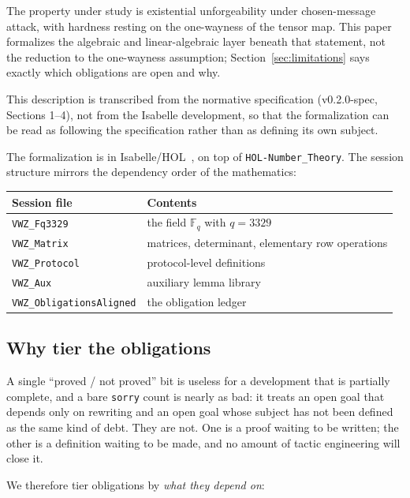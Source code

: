 The property under study is existential unforgeability under chosen-message
attack, with hardness resting on the one-wayness of the tensor map. This paper
formalizes the algebraic and linear-algebraic layer beneath that statement, not
the reduction to the one-wayness assumption; Section~\ref{sec:limitations} says
exactly which obligations are open and why.

This description is transcribed from the normative specification
(v0.2.0-spec, Sections 1--4), not from the Isabelle development, so that the
formalization can be read as following the specification rather than as defining
its own subject.

The formalization is in Isabelle/HOL~\cite{isabelle}, on top of
\texttt{HOL-Number\_Theory}. The
session structure mirrors the dependency order of the mathematics:

\begin{center}
\begin{tabular}{@{}ll@{}}
\toprule
Session file & Contents \\
\midrule
\texttt{VWZ\_Fq3329} & the field $\mathbb{F}_q$ with $q = 3329$ \\
\texttt{VWZ\_Matrix} & matrices, determinant, elementary row operations \\
\texttt{VWZ\_Protocol} & protocol-level definitions \\
\texttt{VWZ\_Aux} & auxiliary lemma library \\
\texttt{VWZ\_ObligationsAligned} & the obligation ledger \\
\bottomrule
\end{tabular}
\end{center}

\subsection{Why tier the obligations}

A single ``proved / not proved'' bit is useless for a development that is
partially complete, and a bare \texttt{sorry} count is nearly as bad: it treats
an open goal that depends only on rewriting and an open goal whose subject has
not been defined as the same kind of debt. They are not. One is a proof waiting
to be written; the other is a definition waiting to be made, and no amount of
tactic engineering will close it.

We therefore tier obligations by \emph{what they depend on}:

